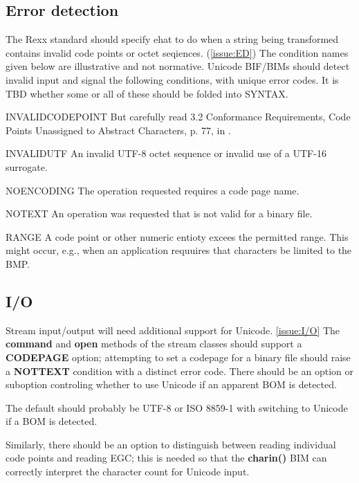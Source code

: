 \documentclass[b4paper]{article}
\begin{document}
\subsection{Error detection}
The Rexx standard should specify ehat to do when a string being transformed
contains invalid code points or octet seqiences. (\cref{issue:ED})
The condition names given below are illustrative and not normative.
Unicode BIF/BIMs should detect invalid input and signal the following conditions, with unique error codes.
It is TBD whether some or all of these should be folded into SYNTAX.

\begin{definition}
\item [INVALIDCODEPOINT]%
But carefully read 3.2 Conformance Requirements,
Code Points Unassigned to Abstract Characters, p. 77, in \cite{Unicode}.
\item[INVALIDUTF]%
An invalid UTF-8 octet sequence or invalid use of a UTF-16 surrogate.
\item [NOENCODING]%
The operation requested requires a code page name.
\item [NOTEXT]%
An operation was requested that is not valid for a binary file.
\item [RANGE]%
A code point or other numeric entioty excees the permitted range.
This might occur, e.g., when an application requuires that characters be limited to the BMP.
\end{definition}

\subsection{I/O}

Stream input/output will need additional support for Unicode.
\cref{issue:I/O}
The \textbf{command}  and \textbf{open} methods of the stream classes
should support a \textbf{CODEPAGE} option; attempting to set a
codepage for a binary file should raise a \textbf{NOTTEXT} condition
with a distinct error code.  There should be an option or suboption
controling whether to use Unicode if an apparent BOM is detected.

The default should probably be UTF-8 or ISO 8859-1 with switching to
Unicode if a BOM is detected.

Similarly, there should be an option to distinguish between reading
individual code points and reading EGC; this is needed so that the
\textbf{charin()} BIM can correctly interpret the character count for Unicode input.
\end{document}
